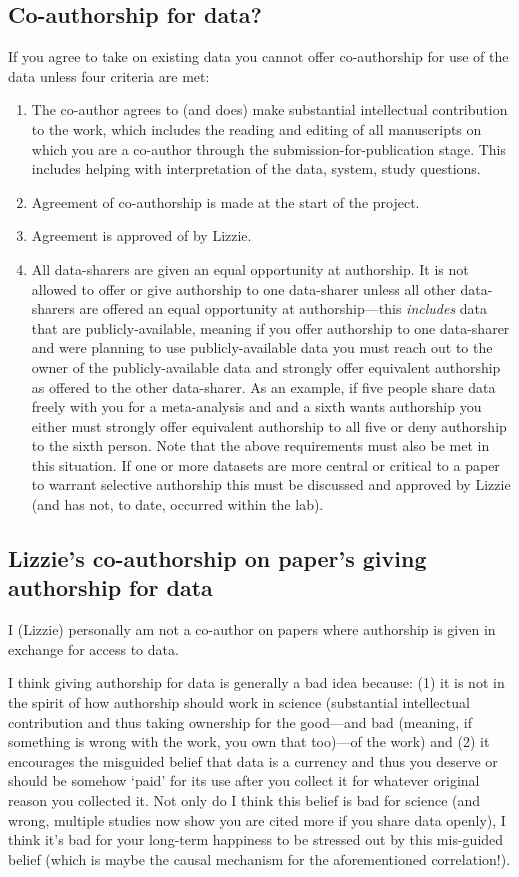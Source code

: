 \documentclass[11pt,a4paper,oneside]{article}
\begin{document}
\subsection{Co-authorship for data?}
If you agree to take on existing data you cannot offer co-authorship for use of the data unless four criteria are met:
\begin{enumerate}
\item The co-author agrees to (and does) make substantial intellectual contribution to the work, which includes the reading and editing of all manuscripts on which you are a co-author through the submission-for-publication stage. This includes helping with interpretation of the data, system, study questions. 
\item Agreement of co-authorship is made at the start of the project.
\item Agreement is approved of by Lizzie.
\item All data-sharers are given an equal opportunity at authorship. It is not allowed to offer or give authorship to one data-sharer unless all other data-sharers are offered an equal opportunity at authorship---this \emph{includes} data that are publicly-available, meaning if you offer authorship to one data-sharer and were planning to use publicly-available data you must reach out to the owner of the publicly-available data and strongly offer equivalent authorship as offered to the other data-sharer. As an example, if five people share data freely with you for a meta-analysis and and a sixth wants authorship you either must strongly offer equivalent authorship to all five or deny authorship to the sixth person. Note that the above requirements must also be met in this situation. If one or more datasets are more central or critical to a paper to warrant selective authorship this must be discussed and approved by Lizzie (and has not, to date, occurred within the lab). 
\end{enumerate}

\subsection{Lizzie's co-authorship on paper's giving authorship for data}
I (Lizzie) personally am not a co-author on papers where authorship is given in exchange for access to data. 

I think giving authorship for data is generally a bad idea because: (1) it is not in the spirit of how authorship should work in science (substantial intellectual contribution and thus taking ownership for the good---and bad (meaning, if something is wrong with the work, you own that too)---of the work) and (2) it encourages the misguided belief that data is a currency and thus you deserve or should be somehow `paid' for its use after you collect it for whatever original reason you collected it. Not only do I think this belief is bad for science (and wrong, multiple studies now show you are cited more if you share data openly), I think it's bad for your long-term happiness to be stressed out by this mis-guided belief (which is maybe the causal mechanism for the aforementioned correlation!). 
\end{document}
